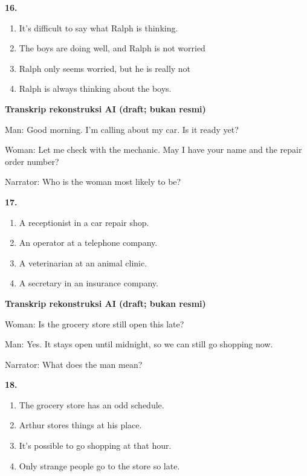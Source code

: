 \documentclass[12pt]{article}
\begin{document}
\noindent\textbf{16.}
\begin{enumerate}[label=(\Alph*),leftmargin=*,itemsep=0.2em]
\item It's difficult to say what Ralph is thinking.
\item The boys are doing well, and Ralph is not worried
\item Ralph only seems worried, but he is really not
\item Ralph is always thinking about the boys.
\end{enumerate}
\par
\vspace{0.25\baselineskip}
\begin{exampleblock}
\textbf{Transkrip rekonstruksi AI (draft; bukan resmi)}\par
Man: Good morning. I'm calling about my car. Is it ready yet?\par
Woman: Let me check with the mechanic. May I have your name and the repair order number?\par
Narrator: Who is the woman most likely to be?\par
\end{exampleblock}
\noindent\textbf{17.}
\begin{enumerate}[label=(\Alph*),leftmargin=*,itemsep=0.2em]
\item A receptionist in a car repair shop.
\item An operator at a telephone company.
\item A veterinarian at an animal clinic.
\item A secretary in an insurance company.
\end{enumerate}
\par
\vspace{0.25\baselineskip}
\begin{exampleblock}
\textbf{Transkrip rekonstruksi AI (draft; bukan resmi)}\par
Woman: Is the grocery store still open this late?\par
Man: Yes. It stays open until midnight, so we can still go shopping now.\par
Narrator: What does the man mean?\par
\end{exampleblock}
\noindent\textbf{18.}
\begin{enumerate}[label=(\Alph*),leftmargin=*,itemsep=0.2em]
\item The grocery store has an odd schedule.
\item Arthur stores things at his place.
\item It's possible to go shopping at that hour.
\item Only strange people go to the store so late.
\end{enumerate}
\end{document}
